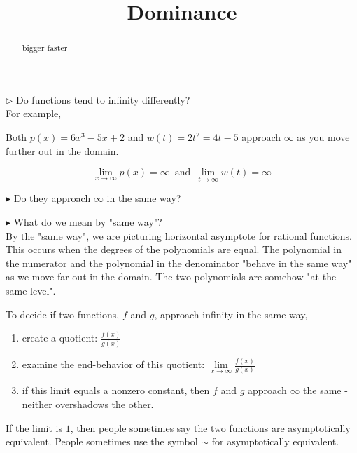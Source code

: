\documentclass{ximera}
\title{Dominance}
\begin{document}
\begin{abstract}
bigger faster
\end{abstract}
\maketitle







$\rhd$ Do functions tend to infinity differently? \\



For example,

Both $p(x) = 6x^3 - 5x + 2$ and $w(t) = 2t^2 = 4t - 5$ approach $\infty$ as you move further out in the domain.



\[    \lim_{x \to \infty} p(x) = \infty  \, \text{ and }  \,       \lim_{t \to \infty} w(t) = \infty                \]

$\blacktriangleright$ Do they approach $\infty$ in the same way? 

$\blacktriangleright$ What do we mean by "same way"?  \\






By the "same way", we are picturing horizontal asymptote for rational functions. This occurs when the degrees of the polynomials are equal.   The polynomial in the numerator and the polynomial in the denominator "behave in the same way" as we move far out in the domain.  The two polynomials are somehow "at the same level". \\




\begin{idea}


To decide if two functions, $f$ and $g$, approach infinity in the same way, 

\begin{enumerate}
\item create a quotient: $\frac{f(x)}{g(x)}$ \\


\item examine the end-behavior of this quotient: $\lim\limits_{x \to \infty} \frac{f(x)}{g(x)}$ \\


\item if this limit equals a nonzero constant, then $f$ and $g$ approach $\infty$ the same - neither overshadows the other.
\end{enumerate}


If the limit is $1$, then people sometimes say the two functions are asymptotically equivalent. People sometimes use the symbol $\sim$ for asymptotically equivalent. \\

\end{idea}
\end{document}
